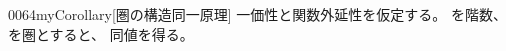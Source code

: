 \documentclass[index]{subfiles}
\begin{document}
\begin{myBlock}{0064}{myCorollary}[圏の構造同一原理]
  一価性と関数外延性を仮定する。
  を階数、
  を圏とすると、
  同値を得る。\myQed
\end{myBlock}
\end{document}
